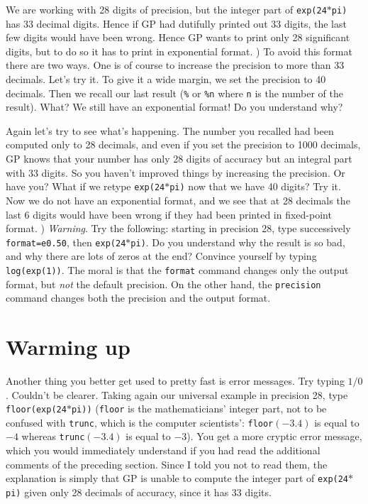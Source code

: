 We are working with 28 digits of precision, but the integer part of {\tt exp(24$*$pi)}
has 33 decimal digits. Hence if GP had dutifully printed out 33 digits, 
the last few digits would have been wrong. Hence GP wants to print only 28
significant digits, but to do so it has to print in exponential format.
) To avoid this format there are two ways. One is of course to increase the precision
to more than 33 decimals. Let's try it. To give it a wide margin, we set the
precision to 40 decimals. Then we recall our last result ({\tt \%} or {\tt \%n}
where {\tt n} is the number of the result). What? We still have an
exponential format! Do you understand why?

Again let's try to see what's happening. The number you recalled had been computed only
to 28 decimals, and even if you set the precision to 1000 decimals, GP knows that
your number has only 28 digits of accuracy but an integral part with 33 digits. So
you haven't improved things by increasing the precision. Or have you? What if we
retype {\tt exp(24$*$pi)} now that we have 40 digits? Try it. Now we do not have
an exponential format, and we see that at 28 decimals the last 6 digits
would have been wrong if they had been printed in fixed-point format.
) {\sl Warning\/}. Try the following: starting in precision 28, type 
successively {\tt \bs format=e0.50}, then {\tt exp(24$*$pi)}. Do you
understand why the result is so bad, and why there are lots of zeros at the end?
Convince yourself by typing {\tt log(exp(1))}. The moral is that the {\tt format}
command changes only the output format, but {\sl not\/} the default precision.
On the other hand, the {\tt precision} command changes both the precision and
the output format.
\medskip
\section{Warming up}
\medskip
Another thing you better get used to pretty fast is error messages. Try typing
$1/0$. Couldn't be clearer. Taking again our universal example in precision 28,
type {\tt floor(exp(24$*$pi))} ({\tt floor} is the mathematicians' integer part, not
to be confused with {\tt trunc}, which is the computer scientists': 
{\tt floor$(-3.4)$} is equal to $-4$ whereas {\tt trunc$(-3.4)$} is equal to $-3$).
You get a more cryptic error message, which you would immediately understand if you
had read the additional comments of the preceding section. Since I told you not
to read them, the explanation is simply that GP is unable to compute the integer
part of {\tt exp(24$*$pi)} given only 28 decimals of accuracy, since it has 33 digits.

